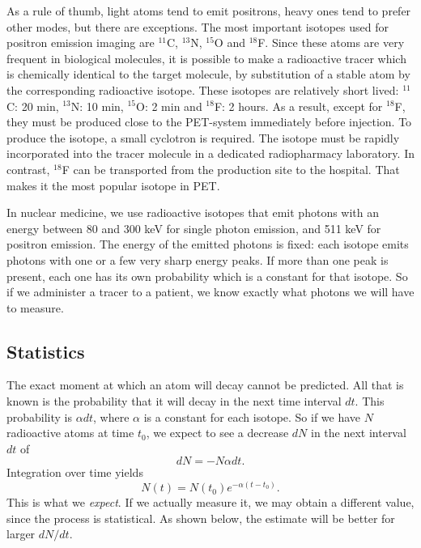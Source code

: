 \documentclass[11pt,oneside]{article}
\begin{document}
As a rule of thumb, light atoms tend to emit positrons, heavy ones
tend to prefer other modes, but there are exceptions. The most
important isotopes used for positron emission imaging are $^{11}$C,
$^{13}$N, $^{15}$O and $^{18}$F. Since these atoms are very frequent
in biological molecules, it is possible to make a radioactive tracer
which is chemically identical to the target molecule, by substitution
of a stable atom by the corresponding radioactive isotope. These
isotopes are relatively short lived: $^{11}$C: 20 min, $^{13}$N: 10
min, $^{15}$O: 2 min and $^{18}$F: 2 hours. As a result, except for
$^{18}$F, they must be produced close to the PET-system immediately
before injection. To produce the isotope, a small cyclotron is
required. The isotope must be rapidly incorporated into the tracer
molecule in a dedicated radiopharmacy laboratory. In contrast,
$^{18}$F can be transported from the production site to the
hospital. That makes it the most popular isotope in PET.

In nuclear medicine, we use radioactive isotopes that emit photons with an
energy between 80 and 300 keV for single photon emission, and 511 keV for
positron emission. The energy of the emitted photons is fixed: each isotope
emits photons with one or a few very sharp energy peaks. If more than one peak
is present, each one has its own probability which is a constant for that
isotope. So if we administer a tracer to a patient, we know exactly what
photons we will have to measure.


\subsection{Statistics} \label{sec:statistics}
The exact moment at which an atom will decay cannot be predicted. All that is
known is the probability that it will decay in the next time interval $dt$.
This probability is $\alpha dt$, where $\alpha$ is a constant for each
isotope.  So if we have $N$ radioactive atoms at time $t_0$, we expect to
see a decrease $dN$ in the next interval $dt$ of
\begin{equation}
  dN = - N \alpha dt. \label{eq:dN}
\end{equation}
Integration over time yields
\begin{equation}
  N(t) = N(t_0) e^{- \alpha (t - t_0)}. \label{jn:decay}
\end{equation}
This is what we {\em expect}. If we actually measure it, we may obtain a
different value, since the process is statistical. As shown below, the
estimate will be better for larger $dN/dt$.
\end{document}
